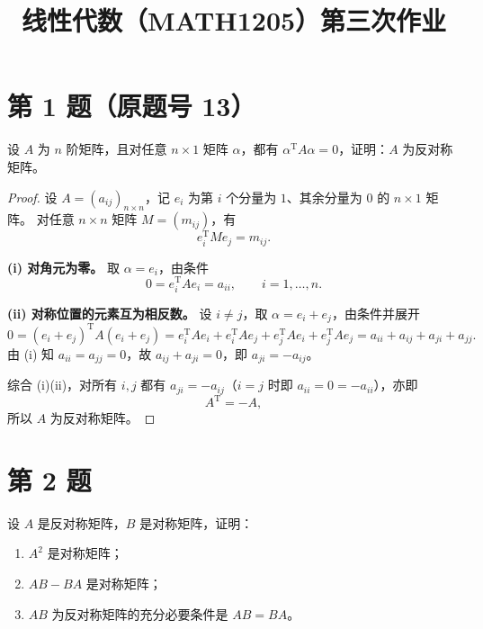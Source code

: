 \documentclass[11pt,a4paper]{ctexart}
\title{线性代数（MATH1205）第三次作业}
\author{}
\date{}
\newenvironment{problem}[1]
  {\par\medskip\noindent\textbf{#1}\quad}
  {\par}
\begin{document}
\maketitle
\vspace{-3em}

\section*{第 1 题（原题号 13）}

\begin{problem}{}设 $A$ 为 $n$ 阶矩阵，且对任意 $n\times1$ 矩阵 $\alpha$，都有 $\alpha^{\mathrm T}A\alpha=0$，证明：$A$ 为反对称矩阵。\end{problem}

\begin{proof}
设 $A=(a_{ij})_{n\times n}$，记 $e_i$ 为第 $i$ 个分量为 $1$、其余分量为 $0$ 的 $n\times1$ 矩阵。
对任意 $n\times n$ 矩阵 $M=(m_{ij})$，有
\[
e_i^{\mathrm T}Me_j=m_{ij}.
\]

\textbf{(i) 对角元为零。} 取 $\alpha=e_i$，由条件
\[
0=e_i^{\mathrm T}Ae_i=a_{ii},\qquad i=1,\dots,n.
\]

\textbf{(ii) 对称位置的元素互为相反数。} 设 $i\neq j$，取 $\alpha=e_i+e_j$，由条件并展开
\[
0=(e_i+e_j)^{\mathrm T}A(e_i+e_j)
=e_i^{\mathrm T}Ae_i+e_i^{\mathrm T}Ae_j+e_j^{\mathrm T}Ae_i+e_j^{\mathrm T}Ae_j
=a_{ii}+a_{ij}+a_{ji}+a_{jj}.
\]
由 (i) 知 $a_{ii}=a_{jj}=0$，故 $a_{ij}+a_{ji}=0$，即 $a_{ji}=-a_{ij}$。

综合 (i)(ii)，对所有 $i,j$ 都有 $a_{ji}=-a_{ij}$（$i=j$ 时即 $a_{ii}=0=-a_{ii}$），亦即
\[
A^{\mathrm T}=-A,
\]
所以 $A$ 为反对称矩阵。
\end{proof}

\section*{第 2 题}

\begin{problem}{}设 $A$ 是反对称矩阵，$B$ 是对称矩阵，证明：
\begin{enumerate}[label=(\arabic*)]
  \item $A^2$ 是对称矩阵；
  \item $AB-BA$ 是对称矩阵；
  \item $AB$ 为反对称矩阵的充分必要条件是 $AB=BA$。
\end{enumerate}
\end{problem}
\end{document}
